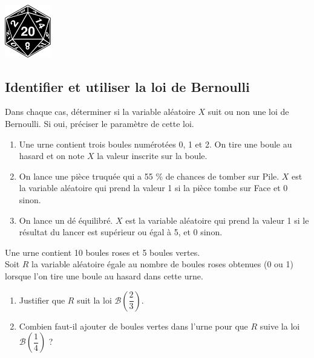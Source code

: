 \documentclass[a4paper,11pt,exos]{nsi} %
\begin{document}
\exo{}
\textcolor{UGLiBlue}{
{\includegraphics[width=2cm]{d20-7136921_640.png}}}

\subsection*{Identifier et utiliser la loi de Bernoulli}
Dans chaque cas, déterminer si la variable aléatoire $X$ suit ou non une loi de Bernoulli. Si oui, préciser le paramètre de cette loi.
\begin{enumerate}
    \item Une urne contient trois boules numérotées 0, 1 et 2. On tire une boule au hasard et on note $X$ la valeur inscrite sur la boule.
    \item On lance une pièce truquée qui a 55 \% de chances de tomber sur Pile. $X$ est la variable aléatoire qui prend la valeur 1 si la pièce tombe sur Face et 0 sinon.
    \item On lance un dé équilibré. $X$ est la variable aléatoire qui prend la valeur 1 si le résultat du lancer est supérieur ou égal à 5, et 0 sinon.
\end{enumerate}

\exo{}
Une urne contient 10 boules roses et 5 boules vertes.\\
Soit $R$ la variable aléatoire égale au nombre de boules roses obtenues (0 ou 1) lorsque l'on tire une boule au hasard dans cette urne.
\begin{enumerate}
    \item Justifier que $R$ suit la loi $\mathcal{B}\left(\dfrac{2}{3}\right)$.
    \item Combien faut-il ajouter de boules vertes dans l'urne pour que $R$ suive la loi $\mathcal{B}\left(\dfrac{1}{4}\right)$ ?
\end{enumerate}
\end{document}
